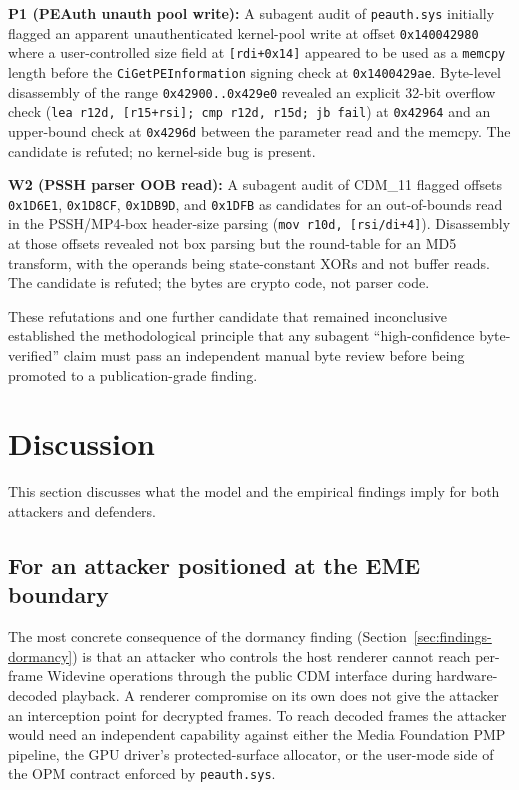 \documentclass[11pt,letterpaper]{article}
\let\oldsection\section
\renewcommand{\section}{\clearpage\oldsection}
\begin{document}
\textbf{P1 (PEAuth unauth pool write):} A subagent audit of
\texttt{peauth.sys} initially flagged an apparent unauthenticated
kernel-pool write at offset \texttt{0x140042980} where a
user-controlled size field at \texttt{[rdi+0x14]} appeared to be
used as a \texttt{memcpy} length before the
\texttt{CiGetPEInformation} signing check at
\texttt{0x1400429ae}. Byte-level disassembly of the range
\texttt{0x42900..0x429e0} revealed an explicit 32-bit overflow
check (\texttt{lea r12d, [r15+rsi]; cmp r12d, r15d; jb fail}) at
\texttt{0x42964} and an upper-bound check at \texttt{0x4296d}
between the parameter read and the memcpy. The candidate is
refuted; no kernel-side bug is present.

\textbf{W2 (PSSH parser OOB read):} A subagent audit of CDM\_11
flagged offsets \texttt{0x1D6E1}, \texttt{0x1D8CF},
\texttt{0x1DB9D}, and \texttt{0x1DFB} as candidates for an
out-of-bounds read in the PSSH/MP4-box header-size parsing
(\texttt{mov r10d, [r{si/di}+4]}). Disassembly at those offsets
revealed not box parsing but the round-table for an MD5 transform,
with the operands being state-constant XORs and not buffer reads.
The candidate is refuted; the bytes are crypto code, not parser
code.

These refutations and one further candidate that remained
inconclusive established the methodological principle that any
subagent ``high-confidence byte-verified'' claim must pass an
independent manual byte review before being promoted to a
publication-grade finding.

\section{Discussion}
\label{sec:discussion}

This section discusses what the model and the empirical findings
imply for both attackers and defenders.

\subsection{For an attacker positioned at the EME boundary}

The most concrete consequence of the dormancy finding
(Section~\ref{sec:findings-dormancy}) is that an attacker who
controls the host renderer cannot reach per-frame Widevine
operations through the public CDM interface during hardware-decoded
playback. A renderer compromise on its own does not give the
attacker an interception point for decrypted frames. To reach
decoded frames the attacker would need an independent
capability against either the Media Foundation PMP pipeline, the
GPU driver's protected-surface allocator, or the user-mode side of
the OPM contract enforced by \texttt{peauth.sys}.
\end{document}
